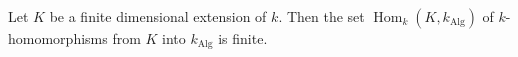 Let $K$ be a finite dimensional extension of $k$. Then the set $\operatorname{Hom}_k(K, k_{\text{Alg}})$ of $k$-homomorphisms from $K$ into $k_{\text{Alg}}$ is finite.
